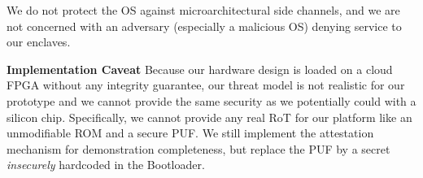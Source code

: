 We do not protect the OS against microarchitectural side channels, and we are not concerned with an adversary (especially a malicious OS) denying service to our enclaves.

\textbf{Implementation Caveat}
Because our hardware design is loaded on a cloud FPGA without any integrity guarantee, our threat model is not realistic for our prototype and we cannot provide the same security as we potentially could with a silicon chip.
Specifically, we cannot provide any real RoT for our platform like an unmodifiable ROM and a secure PUF.
We still implement the attestation mechanism for demonstration completeness, but replace the PUF by a secret \emph{insecurely} hardcoded in the Bootloader.